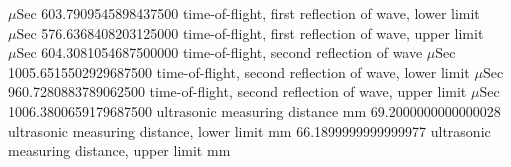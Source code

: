 \expandafter\def\csname oct2tex.air_d70_v800_P.t2.u\endcsname{\ensuremath{\mu\text{Sec}}}
\expandafter\def\csname oct2tex.air_d70_v800_P.t2.v\endcsname{603.7909545898437500}
\expandafter\def\csname oct2tex.air_d70_v800_P.t2a.d\endcsname{time-of-flight, first reflection of wave, lower limit}
\expandafter\def\csname oct2tex.air_d70_v800_P.t2a.u\endcsname{\ensuremath{\mu\text{Sec}}}
\expandafter\def\csname oct2tex.air_d70_v800_P.t2a.v\endcsname{576.6368408203125000}
\expandafter\def\csname oct2tex.air_d70_v800_P.t2b.d\endcsname{time-of-flight, first reflection of wave, upper limit}
\expandafter\def\csname oct2tex.air_d70_v800_P.t2b.u\endcsname{\ensuremath{\mu\text{Sec}}}
\expandafter\def\csname oct2tex.air_d70_v800_P.t2b.v\endcsname{604.3081054687500000}
\expandafter\def\csname oct2tex.air_d70_v800_P.t3.d\endcsname{time-of-flight, second reflection of wave}
\expandafter\def\csname oct2tex.air_d70_v800_P.t3.u\endcsname{\ensuremath{\mu\text{Sec}}}
\expandafter\def\csname oct2tex.air_d70_v800_P.t3.v\endcsname{1005.6515502929687500}
\expandafter\def\csname oct2tex.air_d70_v800_P.t3a.d\endcsname{time-of-flight, second reflection of wave, lower limit}
\expandafter\def\csname oct2tex.air_d70_v800_P.t3a.u\endcsname{\ensuremath{\mu\text{Sec}}}
\expandafter\def\csname oct2tex.air_d70_v800_P.t3a.v\endcsname{960.7280883789062500}
\expandafter\def\csname oct2tex.air_d70_v800_P.t3b.d\endcsname{time-of-flight, second reflection of wave, upper limit}
\expandafter\def\csname oct2tex.air_d70_v800_P.t3b.u\endcsname{\ensuremath{\mu\text{Sec}}}
\expandafter\def\csname oct2tex.air_d70_v800_P.t3b.v\endcsname{1006.3800659179687500}
\expandafter\def\csname oct2tex.air_d70_v800_P.umd.d\endcsname{ultrasonic measuring distance}
\expandafter\def\csname oct2tex.air_d70_v800_P.umd.u\endcsname{\ensuremath{\text{mm}}}
\expandafter\def\csname oct2tex.air_d70_v800_P.umd.v\endcsname{69.2000000000000028}
\expandafter\def\csname oct2tex.air_d70_v800_P.umda.d\endcsname{ultrasonic measuring distance, lower limit}
\expandafter\def\csname oct2tex.air_d70_v800_P.umda.u\endcsname{\ensuremath{\text{mm}}}
\expandafter\def\csname oct2tex.air_d70_v800_P.umda.v\endcsname{66.1899999999999977}
\expandafter\def\csname oct2tex.air_d70_v800_P.umdb.d\endcsname{ultrasonic measuring distance, upper limit}
\expandafter\def\csname oct2tex.air_d70_v800_P.umdb.u\endcsname{\ensuremath{\text{mm}}}
